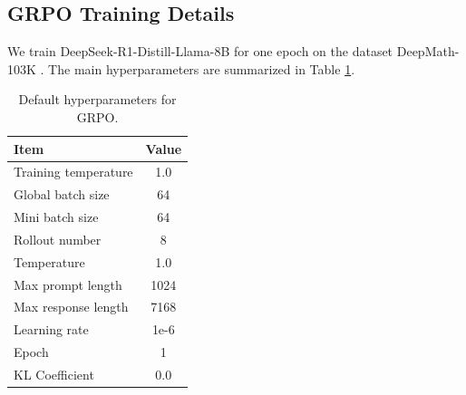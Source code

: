 \subsection{GRPO Training Details} \label{app:grpo_training_details}
We train DeepSeek-R1-Distill-Llama-8B for one epoch on the dataset 
DeepMath-103K \citep{deepmath}. The main hyperparameters are summarized in Table \ref{tab:grpo_hyperparameters}.

\begin{table}[htbp]
\centering
\caption{Default hyperparameters for GRPO.}
\label{tab:grpo_hyperparameters}
\begin{tabular}{lc}
\toprule
\textbf{Item} & \textbf{Value} \\
\midrule
Training temperature & 1.0 \\
Global batch size & 64 \\
Mini batch size & 64 \\
Rollout number & 8 \\
Temperature & 1.0 \\
Max prompt length & 1024 \\
Max response length & 7168 \\
Learning rate & 1e-6 \\
Epoch & 1 \\
KL Coefficient & 0.0 \\
\bottomrule
\end{tabular}
\end{table}

